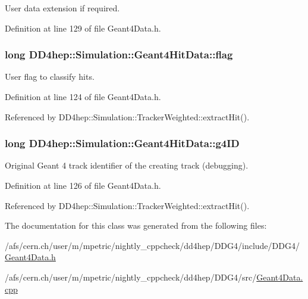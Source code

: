 User data extension if required. 

Definition at line 129 of file Geant4Data.h.\hypertarget{class_d_d4hep_1_1_simulation_1_1_geant4_hit_data_aee4dddb74fa4230f4a450f5eb96416af}{
\subsubsection[{flag}]{\setlength{\rightskip}{0pt plus 5cm}long {\bf DD4hep::Simulation::Geant4HitData::flag}}}
\label{class_d_d4hep_1_1_simulation_1_1_geant4_hit_data_aee4dddb74fa4230f4a450f5eb96416af}


User flag to classify hits. 

Definition at line 124 of file Geant4Data.h.

Referenced by DD4hep::Simulation::TrackerWeighted::extractHit().\hypertarget{class_d_d4hep_1_1_simulation_1_1_geant4_hit_data_adaf354d937bc941aac70b2327aa1d1f3}{
\subsubsection[{g4ID}]{\setlength{\rightskip}{0pt plus 5cm}long {\bf DD4hep::Simulation::Geant4HitData::g4ID}}}
\label{class_d_d4hep_1_1_simulation_1_1_geant4_hit_data_adaf354d937bc941aac70b2327aa1d1f3}


Original Geant 4 track identifier of the creating track (debugging). 

Definition at line 126 of file Geant4Data.h.

Referenced by DD4hep::Simulation::TrackerWeighted::extractHit().

The documentation for this class was generated from the following files:\begin{DoxyCompactItemize}
\item 
/afs/cern.ch/user/m/mpetric/nightly\_\-cppcheck/dd4hep/DDG4/include/DDG4/\hyperlink{_geant4_data_8h}{Geant4Data.h}\item 
/afs/cern.ch/user/m/mpetric/nightly\_\-cppcheck/dd4hep/DDG4/src/\hyperlink{_geant4_data_8cpp}{Geant4Data.cpp}\end{DoxyCompactItemize}
